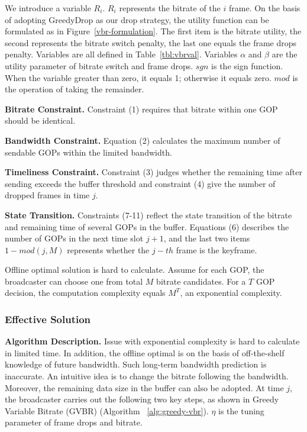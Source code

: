 We introduce a variable $R_{i}$. $R_{i}$ represents the bitrate of the $i$ frame. On the basis of adopting GreedyDrop as our drop strategy, the utility function can be formulated as in Figure~\ref{vbr-formulation}.
The first item is the bitrate utility, the second represents the bitrate switch penalty, the last one equals the frame drops penalty. Variables are all defined in Table~\ref{tbl:vbrval}. Variables $\alpha$ and $\beta$ are the utility parameter of bitrate switch and frame drops. $sgn$ is the sign function. When the variable greater than zero, it equals 1; otherwise it equals zero. $mod$ is the operation of taking the remainder.

\textbf{Bitrate Constraint.} Constraint (1) requires that bitrate within one GOP should be identical.

\textbf{Bandwidth Constraint.} Equation (2) calculates the maximum number of sendable GOPs within the limited bandwidth.

\textbf{Timeliness Constraint.} Constraint (3) judges whether the remaining time after sending exceeds the buffer threshold and constraint (4) give the number of dropped frames in time $j$.

\textbf{State Transition.} Constraints (7-11) reflect the state transition of the bitrate and remaining time of several GOPs in the buffer. Equations (6) describes the number of GOPs in the next time slot $j+1$, and the last two items $1-mod(j,M)$ represents whether the $j-th$ frame is the keyframe.

Offline optimal solution is hard to calculate. Assume for each GOP, the broadcaster can choose one from total $M$ bitrate candidates. For a $T$ GOP decision, the computation complexity equals $M^T$, an exponential complexity.

\subsubsection{Effective Solution}

\textbf{Algorithm Description.} Issue with exponential complexity is hard to calculate in limited time. In addition, the offline optimal is on the basis of off-the-shelf knowledge of future bandwidth. Such long-term bandwidth prediction is inaccurate. An intuitive idea is to change the bitrate following the bandwidth. Moreover, the remaining data size in the buffer can also be adopted. At time $j$, the broadcaster carries out the following two key steps, as shown in Greedy Variable Bitrate (GVBR) (Algorithm ~\ref{alg:greedy-vbr}). $\eta$ is the tuning parameter of frame drops and bitrate.

